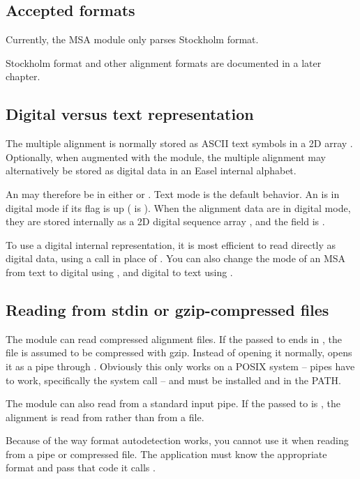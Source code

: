 \subsection{Accepted formats}

Currently, the MSA module only parses Stockholm format. 

Stockholm format and other alignment formats are documented in a later
chapter.

\subsection{Digital versus text representation}

The multiple alignment is normally stored as ASCII text symbols in a
2D array . Optionally, when
augmented with the  module, the multiple alignment
may alternatively be stored as digital data in an Easel internal
alphabet.

An  may therefore be in either  or
. Text mode is the default behavior. An
 is in digital mode if its  flag
is up ( is ). When the
alignment data are in digital mode, they are stored internally as a 2D
digital sequence array , and
the  field is .

To use a digital internal representation, it is most efficient to read
directly as digital data, using a 
call in place of . You can also change the
mode of an MSA from text to digital using
, and digital to text using
.

\subsection{Reading from stdin or gzip-compressed files}

The module can read compressed alignment files.  If the
 passed to  ends in
, the file is assumed to be compressed with gzip. Instead
of opening it normally,  opens it as a pipe
through . Obviously this only works on a POSIX
system -- pipes have to work, specifically the  system
call -- and  must be installed and in the PATH.

The module can also read from a standard input pipe. If the
 passed to  is \ccode{-},
the alignment is read from  rather than from a file.

Because of the way format autodetection works, you cannot use it when
reading from a pipe or compressed file. The application must know the
appropriate format and pass that code it calls
.
